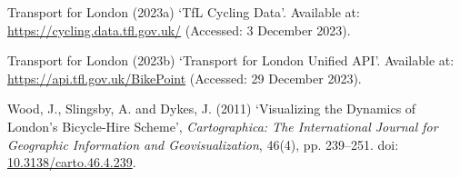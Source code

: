 \documentclass[
  12pt,
  a4paper,
  DIV=11,
  numbers=noendperiod]{scrartcl}
\newlength{\cslhangindent}
\newlength{\cslentryspacingunit} %
\newenvironment{CSLReferences}[2] %
 {%
  \setlength{\parindent}{0pt}
  \ifodd #1
  \let\oldpar\par
  \def\par{\hangindent=\cslhangindent\oldpar}
  \fi
  \setlength{\parskip}{#2\cslentryspacingunit}
 }%
 {}
\begin{document}
\begin{CSLReferences}{0}{0}
\leavevmode{}%
Transport for London (2023a) {`{TfL} {Cycling} {Data}'}. Available at:
\url{https://cycling.data.tfl.gov.uk/} (Accessed: 3 December 2023).

\leavevmode{}%
Transport for London (2023b) {`Transport for {London} {Unified} {API}'}.
Available at: \url{https://api.tfl.gov.uk/BikePoint} (Accessed: 29
December 2023).

\leavevmode{}%
Wood, J., Slingsby, A. and Dykes, J. (2011) {`Visualizing the {Dynamics}
of {London}'s {Bicycle}-{Hire} {Scheme}'}, \emph{Cartographica: The
International Journal for Geographic Information and Geovisualization},
46(4), pp. 239--251. doi:
\href{https://doi.org/10.3138/carto.46.4.239}{10.3138/carto.46.4.239}.

\end{CSLReferences}
\end{document}
